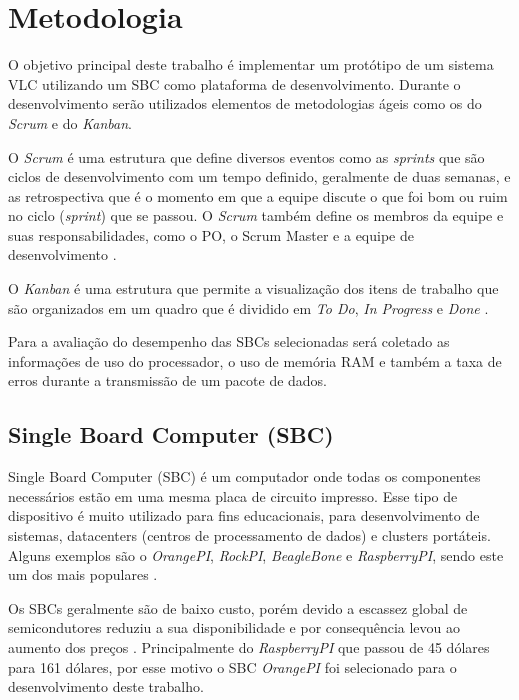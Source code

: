 \chapter{Metodologia}

O objetivo principal deste trabalho é implementar um protótipo de um sistema VLC utilizando um SBC como plataforma de desenvolvimento. Durante o desenvolvimento serão utilizados elementos de metodologias ágeis como os do \textit{Scrum} e do \textit{Kanban}.

O \textit{Scrum} é uma estrutura que define diversos eventos como as \textit{sprints} que são ciclos de desenvolvimento com um tempo definido, geralmente de duas semanas, e as retrospectiva que é o momento em que a equipe discute o que foi bom ou ruim no ciclo (\textit{sprint}) que se passou. O \textit{Scrum} também define os membros da equipe e suas responsabilidades, como o PO, o Scrum Master e a equipe de desenvolvimento \cite{scrum}. 

O \textit{Kanban} é uma estrutura que permite a visualização dos itens de trabalho que são organizados em um quadro que é dividido em \textit{To Do}, \textit{In Progress} e \textit{Done} \cite{kanbam}.

Para a avaliação do desempenho das SBCs selecionadas será coletado as informações de uso do processador, o uso de memória RAM e também a taxa de erros durante a transmissão de um pacote de dados.

\section{Single Board Computer (SBC)}

Single Board Computer (SBC) é um computador onde todas os componentes necessários estão em uma mesma placa de circuito impresso. Esse tipo de dispositivo é muito utilizado para fins educacionais, para desenvolvimento de sistemas, datacenters (centros  de  processamento  de  dados) e clusters portáteis. Alguns exemplos são o \textit{OrangePI}, \textit{RockPI}, \textit{BeagleBone} e \textit{RaspberryPI}, sendo este um dos mais populares \cite{SBC_edu}.

Os SBCs geralmente são de baixo custo, porém devido a escassez global de semicondutores reduziu a sua disponibilidade e por consequência levou ao aumento dos preços \cite{zeng_2022}. Principalmente do \textit{RaspberryPI} que passou de 45 dólares para 161 dólares, por esse motivo o SBC \textit{OrangePI} foi selecionado para o desenvolvimento deste trabalho.

